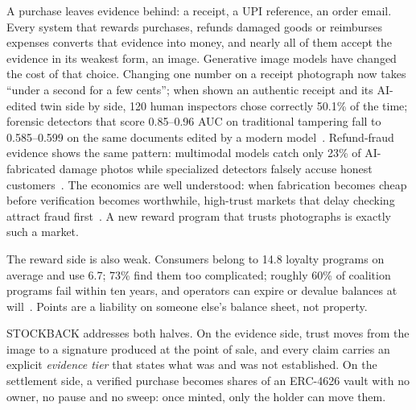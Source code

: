 \documentclass[10.5pt,letterpaper]{article}
\theoremstyle{definition}
\theoremstyle{remark}
\begin{document}
A purchase leaves evidence behind: a receipt, a UPI reference, an order email. Every system that rewards
purchases, refunds damaged goods or reimburses expenses converts that evidence into money, and nearly all of
them accept the evidence in its weakest form, an image. Generative image models have changed the cost of that
choice. Changing one number on a receipt photograph now takes ``under a second for a few cents''; when shown an
authentic receipt and its AI-edited twin side by side, 120 human inspectors chose correctly
50.1\% of the time; forensic detectors that score 0.85--0.96 AUC on traditional tampering fall to
0.585--0.599 on the same documents edited by a modern model~\cite{wu2026forger}. Refund-fraud evidence shows the same
pattern: multimodal models catch only 23\% of AI-fabricated damage photos while specialized detectors
falsely accuse honest customers~\cite{yan2026fraudbench}. The economics are well understood: when fabrication becomes cheap
before verification becomes worthwhile, high-trust markets that delay checking attract fraud first~\cite{yin2026trust}.
A new reward program that trusts photographs is exactly such a market.

The reward side is also weak. Consumers belong to 14.8 loyalty programs on average and use 6.7; 73\% find
them too complicated; roughly 60\% of coalition programs fail within ten years, and operators can expire or
devalue balances at will~\cite{oamen2025rewards}. Points are a liability on someone else's balance sheet, not property.

STOCKBACK addresses both halves. On the evidence side, trust moves from the image to a signature produced at the
point of sale, and every claim carries an explicit \emph{evidence tier} that states what was and was not
established. On the settlement side, a verified purchase becomes shares of an ERC-4626 vault with no owner, no
pause and no sweep: once minted, only the holder can move them.
\end{document}
